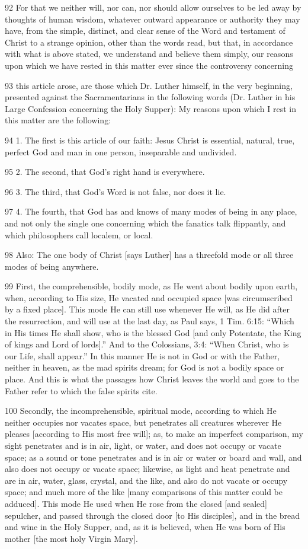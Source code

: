 92 For that we neither will, nor can, nor should allow ourselves to be led away by thoughts of human wisdom, whatever outward appearance or authority they may have, from the simple, distinct, and clear sense of the Word and testament of Christ to a strange opinion, other than the words read, but that, in accordance with what is above stated, we understand and believe them simply, our reasons upon which we have rested in this matter ever since the controversy concerning

93 this article arose, are those which Dr. Luther himself, in the very beginning, presented against the Sacramentarians in the following words (Dr. Luther in his Large Confession concerning the Holy Supper): My reasons upon which I rest in this matter are the following:

94 1. The first is this article of our faith: Jesus Christ is essential, natural, true, perfect God and man in one person, inseparable and undivided.

95 2. The second, that God’s right hand is everywhere.

96 3. The third, that God’s Word is not false, nor does it lie.

97 4. The fourth, that God has and knows of many modes of being in any place, and not only the single one concerning which the fanatics talk flippantly, and which philosophers call localem, or local.

98 Also: The one body of Christ [says Luther] has a threefold mode or all three modes of being anywhere.

99 First, the comprehensible, bodily mode, as He went about bodily upon earth, when, according to His size, He vacated and occupied space [was circumscribed by a fixed place]. This mode He can still use whenever He will, as He did after the resurrection, and will use at the last day, as Paul says, 1 Tim. 6:15: “Which in His times He shall show, who is the blessed God [and only Potentate, the King of kings and Lord of lords].” And to the Colossians, 3:4: “When Christ, who is our Life, shall appear.” In this manner He is not in God or with the Father, neither in heaven, as the mad spirits dream; for God is not a bodily space or place. And this is what the passages how Christ leaves the world and goes to the Father refer to which the false spirits cite.

100 Secondly, the incomprehensible, spiritual mode, according to which He neither occupies nor vacates space, but penetrates all creatures wherever He pleases [according to His most free will]; as, to make an imperfect comparison, my sight penetrates and is in air, light, or water, and does not occupy or vacate space; as a sound or tone penetrates and is in air or water or board and wall, and also does not occupy or vacate space; likewise, as light and heat penetrate and are in air, water, glass, crystal, and the like, and also do not vacate or occupy space; and much more of the like [many comparisons of this matter could be adduced]. This mode He used when He rose from the closed [and sealed] sepulcher, and passed through the closed door [to His disciples], and in the bread and wine in the Holy Supper, and, as it is believed, when He was born of His mother [the most holy Virgin Mary].


